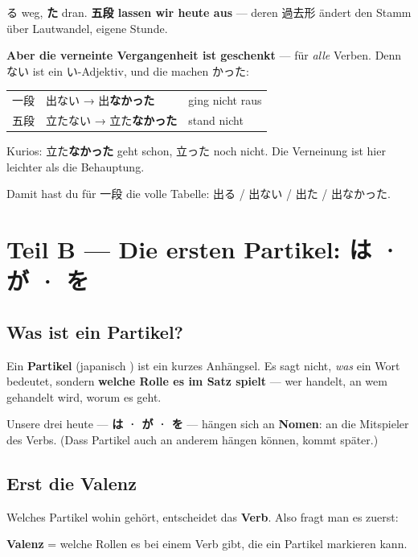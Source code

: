 \documentclass[11pt,a4paper,DIV=12]{scrartcl}
\begin{document}
る weg, \textbf{た} dran. \textbf{五段 lassen wir heute aus} — deren 過去形 ändert den
Stamm über Lautwandel, eigene Stunde.

\textbf{Aber die verneinte Vergangenheit ist geschenkt} — für \emph{alle} Verben.
Denn ない ist ein い-Adjektiv, und die machen かった:

\begin{center}
\begin{tabular}{@{}lll@{}}
一段 & 出ない → 出\textbf{なかった} & ging nicht raus \\
五段 & 立たない → 立た\textbf{なかった} & stand nicht \\
\end{tabular}
\end{center}

\begin{merke}
Kurios: 立た\textbf{なかった} geht schon, 立った noch nicht. Die Verneinung ist hier
leichter als die Behauptung.
\end{merke}

Damit hast du für 一段 die volle Tabelle: 出る / 出ない / 出た / 出なかった.

\section{Teil B — Die ersten Partikel: は · が · を}

\subsection*{Was ist ein Partikel?}

Ein \textbf{Partikel} (japanisch ) ist ein kurzes Anhängsel. Es
sagt nicht, \emph{was} ein Wort bedeutet, sondern \textbf{welche Rolle es im Satz
spielt} — wer handelt, an wem gehandelt wird, worum es geht.

Unsere drei heute — \textbf{は · が · を} — hängen sich an \textbf{Nomen}: an die
Mitspieler des Verbs. (Dass Partikel auch an anderem hängen können, kommt später.)

\subsection*{Erst die Valenz}

Welches Partikel wohin gehört, entscheidet das \textbf{Verb}. Also fragt man es zuerst:

\begin{merke}
\textbf{Valenz} = welche Rollen es bei einem Verb gibt, die ein Partikel markieren kann.
\end{merke}
\end{document}
